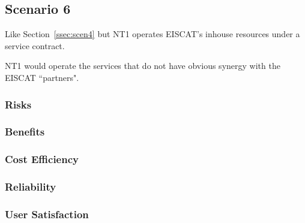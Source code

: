 \documentclass[12pt,a4paper]{article}
\begin{document}
\subsection{Scenario 6}
\label{ssec:scen6}

Like Section~\ref{ssec:scen4} but NT1 operates EISCAT's inhouse resources under a service contract.

NT1 would operate the services that do not have obvious synergy with the EISCAT ``partners".

\subsubsection*{Risks}
\bitm
\item 
\eitm

\subsubsection*{Benefits}
\bitm
\item 
\eitm

\subsubsection*{Cost Efficiency}
\bitm
\item 
\eitm

\subsubsection*{Reliability}
\bitm
\item 
\eitm

\subsubsection*{User Satisfaction}
\bitm
\item 
\eitm
\newpage
{}

\end{document}
